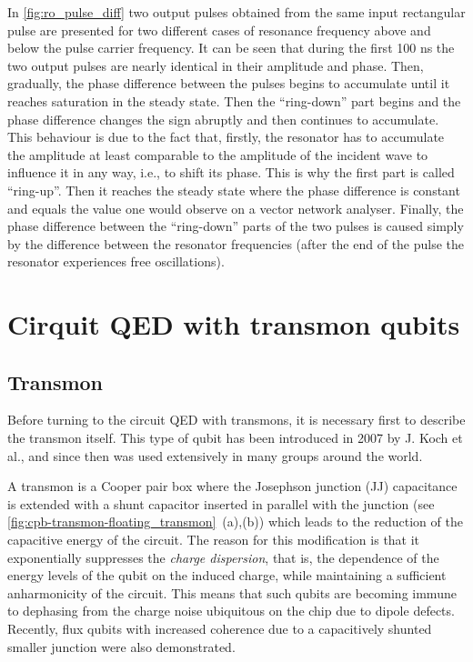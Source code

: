 In \autoref{fig:ro_pulse_diff} two output pulses obtained from the same input rectangular pulse are presented for two different cases of resonance frequency above and below the pulse carrier frequency. It can be seen that during the first 100 ns the two output pulses are nearly identical in their amplitude and phase. Then, gradually, the phase difference between the pulses begins to accumulate until it reaches saturation in the steady state. Then the ``ring-down'' part begins and the phase difference changes the sign abruptly and then continues to accumulate. This behaviour is due to the fact that, firstly, the resonator has to accumulate the amplitude at least comparable to the amplitude of the incident wave to influence it in any way, i.e., to shift its phase. This is why the first part is called ``ring-up''. Then it reaches the steady state where the phase difference is constant and equals the value one would observe on a vector network analyser. Finally, the phase difference between the ``ring-down'' parts of the two pulses is caused simply by the difference between the resonator frequencies (after the end of the pulse the resonator experiences free oscillations).



\newpage

\section{Cirquit QED with transmon qubits}\label{sec:cQED}

\subsection{Transmon}

Before turning to the circuit QED with transmons, it is necessary first to describe the transmon itself. This type of qubit has been introduced\cite{Koch2007} in 2007 by J. Koch et al., and since then was used extensively in many groups around the world. 

A transmon is a Cooper pair box where the Josephson junction (JJ) capacitance is extended with a shunt capacitor inserted in parallel with the junction (see \autoref{fig:cpb-transmon-floating_transmon}~(a),(b)) which leads to the reduction of the capacitive energy of the circuit. The reason for this modification is that it exponentially suppresses the \textit{charge dispersion}, that is, the dependence of the energy levels of the qubit on the induced charge, while maintaining a sufficient anharmonicity of the circuit. This means that such qubits are becoming immune to dephasing from the charge noise ubiquitous on the chip due to dipole defects. Recently, flux qubits with increased coherence due to a capacitively shunted smaller junction were also demonstrated\cite{yan2015}.

